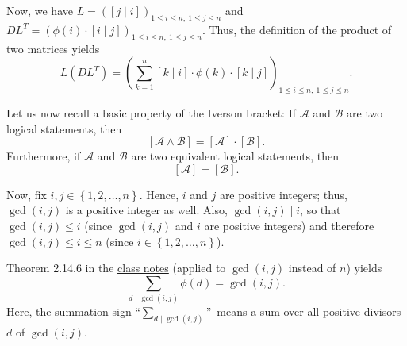 \documentclass[paper=a4, fontsize=12pt]{scrartcl}%
\let\sumnonlimits\sum
\renewcommand{\sum}{\sumnonlimits\limits}
\theoremstyle{plainsl}
\theoremstyle{definition}
\theoremstyle{remark}
\begin{document}
Now, we have $L=\left(  \left[  j\mid i\right]  \right)  _{1\leq i\leq
n,\ 1\leq j\leq n}$ and $DL^{T}=\left(  \phi\left(  i\right)  \cdot\left[
i\mid j\right]  \right)  _{1\leq i\leq n,\ 1\leq j\leq n}$. Thus, the
definition of the product of two matrices yields%
\begin{equation}
L\left(  DL^{T}\right)  =\left(  \sum_{k=1}^{n}\left[  k\mid i\right]
\cdot\phi\left(  k\right)  \cdot\left[  k\mid j\right]  \right)  _{1\leq i\leq
n,\ 1\leq j\leq n}. \label{sol.matrix.gcd-LDU.2}%
\end{equation}


Let us now recall a basic property of the Iverson bracket: If $\mathcal{A}$
and $\mathcal{B}$ are two logical statements, then
\begin{equation}
\left[  \mathcal{A}\wedge\mathcal{B}\right]  =\left[  \mathcal{A}\right]
\cdot\left[  \mathcal{B}\right]  . \label{sol.matrix.gcd-LDU.iverAB}%
\end{equation}
Furthermore, if $\mathcal{A}$ and $\mathcal{B}$ are two equivalent logical
statements, then%
\begin{equation}
\left[  \mathcal{A}\right]  =\left[  \mathcal{B}\right]  .
\label{sol.matrix.gcd-LDU.iverA=B}%
\end{equation}


Now, fix $i,j\in\left\{  1,2,\ldots,n\right\}  $. Hence, $i$ and $j$ are
positive integers; thus, $\gcd\left(  i,j\right)  $ is a positive integer as
well. Also, $\gcd\left(  i,j\right)  \mid i$, so that $\gcd\left(  i,j\right)
\leq i$ (since $\gcd\left(  i,j\right)  $ and $i$ are positive integers) and
therefore $\gcd\left(  i,j\right)  \leq i\leq n$ (since $i\in\left\{
1,2,\ldots,n\right\}  $).

Theorem 2.14.6 in the
\href{http://www.cip.ifi.lmu.de/~grinberg/t/19s/notes.pdf}{class notes}
(applied to $\gcd\left(  i,j\right)  $ instead of $n$) yields%
\begin{equation}
\sum_{d\mid\gcd\left(  i,j\right)  }\phi\left(  d\right)  =\gcd\left(
i,j\right)  . \label{sol.matrix.gcd-LDU.sum-phi}%
\end{equation}
Here, the summation sign \textquotedblleft$\sum_{d\mid\gcd\left(  i,j\right)
}$\textquotedblright\ means a sum over all positive divisors $d$ of
$\gcd\left(  i,j\right)  $.
\end{document}
